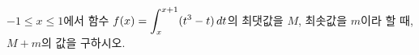 $-1\le x\le 1$에서 함수 $f(x)=\displaystyle\int_{x}^{x+1}(t^3-t)\mkern3mu dt$의 최댓값을 $M$, 최솟값을 $m$이라 할 때, $M+m$의 값을 구하시오.
